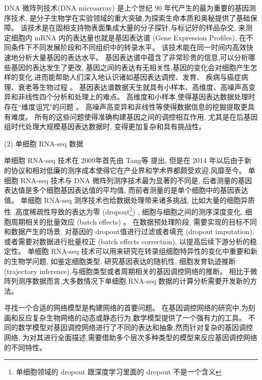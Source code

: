 DNA 微阵列技术(DNA microarray) 是上个世纪 90 年代产生的最为重要的基因测序技术,
是分子生物学在实验领域的重大突破,为探索生命本质和奥秘提供了基础保障。
该技术是在固相支持物表面集成大量的分子探针,与标记好的样品杂交,
来测定细胞内 mRNA 内的表达量也就是基因表达谱 (Gene Expression Profiles),
在不同条件下不同发展阶段和不同组织中的转录水平。
该技术能在同一时间内高效快速地分析大量基因的表达水平。
基因表达谱中蕴含了非常珍贵的信息,可以分析哪些基因的表达发生了更改, 
基因之间的表达有无相关性,基因的变化会对细胞产生怎样的变化,进而能帮助人们深入地认识诸如基因表达调控、发育、
疾病与癌症病理、衰老等生物过程 \cite{chen2005selecting,shen2009new,camargo2008identification}。
基因表达谱数据天生就具有小样本、高维度、高噪声高变异和非线性四个分析和处理上的难点。
高维度和小样本,使得基因表达数据处理时存在``维度诅咒"的问题 \cite{wang2006inferring}。
高噪声高变异和非线性等使得数据信息的挖掘提取更具有难度。
所有的这些问题使得准确构建基因之间的调控相互作用,
尤其是在后基因组时代处理大规模基因表达数据时,
变得更加复杂和具有挑战性。

(2) 单细胞 RNA-seq 数据

单细胞 RNA-seq 技术在 2009年首先由 Tang等 \cite{tang2009mrna}提出,
但是在 2014 年以后由于新的协议和相对低廉的测序成本使得它在产业界和学术界都颇受欢迎,风靡至今。
单细胞 RNA-seq 技术与 DNA 微阵列测序技术最为显著的不同是,
后者测量的基因表达值是多个细胞基因表达值的平均值,
而前者测量的是单个细胞中的基因表达值。
单细胞 RNA-seq 测序技术也给数据处理带来诸多挑战,
比如大量的细胞异质性 \cite{wagner2016revealing},高度稀疏性导致的表达为零 (dropout\footnote{单细胞领域的 dropout 跟深度学习里面的 dropout 不是一个含义}) \cite{vallejos2017normalizing}, 细胞与细胞之间的测序深度变化, 细胞周期相关的批量效应 (batch effects) \cite{buettner2015computational}。
在数据预处理阶段, 需要实现的目标不同和数据产生的场景, 对基因的 dropout值进行过滤或者填充 (dropout imputation), 或者需要对数据进行批量校正 (batch effects correction), 以提高后续下游分析的稳定性。
单细胞 RNA-seq 技术可以用来研究在转录组细胞特异性的变化中重要和新的生物学问题,
如鉴定细胞类型, 研究基因表达的随机性, 细胞发育轨迹推断 (trajectory inference),与细胞类型或者周期相关的基因调控网络的推断。
相比于微阵列测序数据而言,大多数情况下单细胞 RNA-seq 数据的计算分析需要开发新的方法。

寻找一个合适的网络模型是构建网络的首要问题。
在基因调控网络的研究中,为刻画和反应复杂生物网络的动态或静态行为,数学模型提供了一个强有力的工具。
不同的数学模型对基因调控网络进行了不同的表达和抽象,然而针对复杂的基因调控网络,
为对其进行全面描述,需要借助多个层次多种类型的模型来反应基因调控网络的不同特性。


